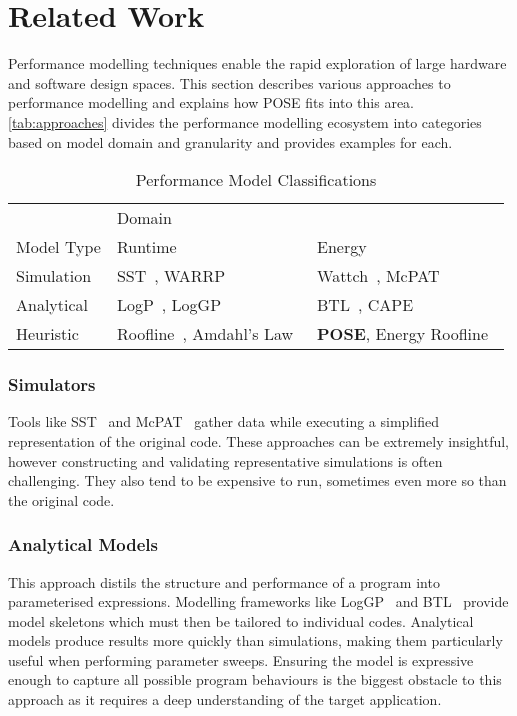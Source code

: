 \section{Related Work}
\label{sec:related}
Performance modelling techniques enable the rapid exploration of large hardware and software design spaces.
This section describes various approaches to performance modelling and explains how POSE fits into this area.
\autoref{tab:approaches} divides the performance modelling ecosystem into categories based on model domain and granularity and provides examples for each.

\begin{table}
  \scriptsize
  \centering
  \caption{Performance Model Classifications}
  \begin{tabular}{lll}
  \toprule
    & \multicolumn{2}{l}{Domain}\\ \cmidrule(){2-3}
  Model Type  & Runtime & Energy \\
    \midrule
  Simulation & SST~\cite{rodrigues:2011aa}, WARRP~\cite{hammond:2009aa} & Wattch~\cite{brooks:2000aa}, McPAT~\cite{li:2009aa}  \\
  Analytical & LogP~\cite{culler:1993aa}, LogGP~\cite{alexandrov:1997aa} & BTL~\cite{manousakis:2012aa}, CAPE~\cite{kamble:1997aa} \\
  Heuristic & Roofline~\cite{williams:2009aa}, Amdahl's Law~\cite{amdahl:1967aa} & \textbf{POSE}, Energy Roofline~\cite{choi:2013aa} \\
  \bottomrule
  \end{tabular}
  \label{tab:approaches}
\end{table}

\noindent
\subsubsection{Simulators} 
Tools like SST~\cite{rodrigues:2011aa} and McPAT~\cite{li:2009aa} gather data while executing a simplified representation of the original code.
These approaches can be extremely insightful, however constructing and validating representative simulations is often challenging.
They also tend to be expensive to run, sometimes even more so than the original code.

\subsubsection{Analytical Models} This approach distils the structure and performance of a program into parameterised expressions.
Modelling frameworks like LogGP~\cite{alexandrov:1997aa} and BTL~\cite{manousakis:2012aa} provide model skeletons which must then be tailored to individual codes.
Analytical models produce results more quickly than simulations, making them particularly useful when performing parameter sweeps.
Ensuring the model is expressive enough to capture all possible program behaviours is the biggest obstacle to this approach as it requires a deep understanding of the target application.

